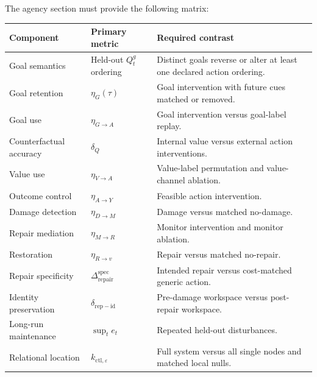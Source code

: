 
The agency section must provide the following matrix:

\begin{center}
\small
\begin{tabularx}{\textwidth}{@{}p{}p{}X@{}}
\toprule
Component & Primary metric & Required contrast \\
\midrule
Goal semantics & Held-out \(Q_t^g\) ordering & Distinct goals reverse or alter
at least one declared action ordering. \\
Goal retention & \(\eta_G(\tau)\) & Goal intervention with future cues matched
or removed. \\
Goal use & \(\eta_{G\to A}\) & Goal intervention versus goal-label replay. \\
Counterfactual accuracy & \(\delta_Q\) & Internal value versus external action
interventions. \\
Value use & \(\eta_{V\to A}\) & Value-label permutation and value-channel
ablation. \\
Outcome control & \(\eta_{A\to Y}\) & Feasible action intervention. \\
Damage detection & \(\eta_{D\to M}\) & Damage versus matched no-damage. \\
Repair mediation & \(\eta_{M\to R}\) & Monitor intervention and monitor
ablation. \\
Restoration & \(\eta_{R\to v}\) & Repair versus matched no-repair. \\
Repair specificity & \(\Delta_{\mathrm{repair}}^{\mathrm{spec}}\) & Intended
repair versus cost-matched generic action. \\
Identity preservation & \(\delta_{\mathrm{rep-id}}\) & Pre-damage workspace
versus post-repair workspace. \\
Long-run maintenance & \(\sup_t e_t\) & Repeated held-out disturbances. \\
Relational location & \(k_{\mathrm{ctl},\varepsilon}\) & Full system versus
all single nodes and matched local nulls. \\
\bottomrule
\end{tabularx}
\end{center}


